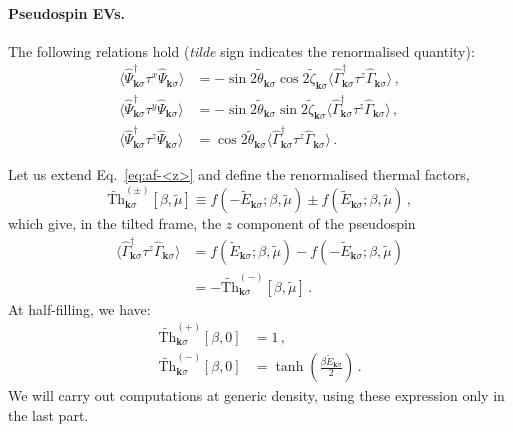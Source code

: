 \paragraph{Pseudospin EVs.}

The following relations hold (\textit{tilde} sign indicates the renormalised quantity):
\[
\begin{aligned}
	\langle \hat \Psi_{\mathbf{k}\sigma}^\dagger \tau^x \hat \Psi_{\mathbf{k}\sigma} \rangle &= -\sin 2\tilde{\theta}_{\mathbf{k}\sigma} \cos 2\tilde{\zeta}_{\mathbf{k}\sigma} \langle \hat \Gamma_{\mathbf{k}\sigma}^\dagger \tau^z \hat \Gamma_{\mathbf{k}\sigma} \rangle \, , \\
	\langle \hat \Psi_{\mathbf{k}\sigma}^\dagger \tau^y \hat \Psi_{\mathbf{k}\sigma} \rangle &= -\sin 2\tilde{\theta}_{\mathbf{k}\sigma} \sin 2\tilde{\zeta}_{\mathbf{k}\sigma} \langle \hat \Gamma_{\mathbf{k}\sigma}^\dagger \tau^z \hat \Gamma_{\mathbf{k}\sigma} \rangle \, , \\
	\langle \hat \Psi_{\mathbf{k}\sigma}^\dagger \tau^z \hat \Psi_{\mathbf{k}\sigma} \rangle &= \cos 2\tilde{\theta}_{\mathbf{k}\sigma} \langle \hat \Gamma_{\mathbf{k}\sigma}^\dagger \tau^z \hat \Gamma_{\mathbf{k}\sigma} \rangle \, .
\end{aligned}
\]

Let us extend Eq.~\eqref{eq:af-<z>} and define the renormalised thermal factors,
\begin{equation}\label{eq:af-~Th}
	\tilde{\mathrm{Th}}_{\mathbf{k}\sigma}^{(\pm)}[\beta,\tilde{\mu}] \equiv 
	f\left(
	-\tilde{E}_{\mathbf{k}\sigma};\beta,\tilde{\mu}
	\right) \pm f\left(
	\tilde{E}_{\mathbf{k}\sigma};\beta,\tilde{\mu} 
	\right) \, ,
\end{equation}
which give, in the tilted frame, the $z$ component of the pseudospin
\begin{align}
	\langle \hat \Gamma_{\mathbf{k}\sigma}^\dagger \tau^z \hat \Gamma_{\mathbf{k}\sigma} \rangle &=
	f\left(
	\tilde{E}_{\mathbf{k}\sigma};\beta,\tilde{\mu}
	\right) - f\left(
	-\tilde{E}_{\mathbf{k}\sigma};\beta,\tilde{\mu}
	\right) \nonumber \\
	&= - \tilde{\mathrm{Th}}_{\mathbf{k}\sigma}^{(-)}[\beta,\tilde{\mu}] \, . \label{eq:af-<~z>}
\end{align}
At half-filling, we have:
\begin{align}
	\tilde{\mathrm{Th}}_{\mathbf{k}\sigma}^{(+)}[\beta,0] &= 1  \, , \label{eq:af-Th+=1} \\
	\tilde{\mathrm{Th}}_{\mathbf{k}\sigma}^{(-)}[\beta,0] &= \tanh(\frac{\beta \tilde{E}_{\mathbf{k}\sigma}}{2}) \, . \label{eq:af-Th-=tanh}
\end{align}
We will carry out computations at generic density, using these expression only in the last part.

